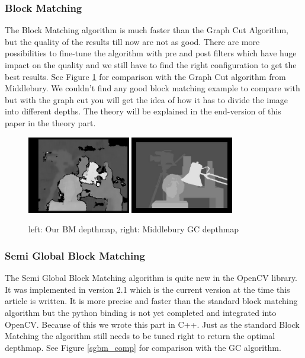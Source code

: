 \documentclass[a4paper]{article}
\begin{document}
\subsubsection{Block Matching}
The Block Matching algorithm is much faster than the Graph Cut
Algorithm, but the quality of the results till now are not as good.
There are more possibilities to fine-tune the algorithm with pre and
post filters which have huge impact on the quality and we still have
to find the right configuration to get the best results. See Figure
\ref{bm_comp} for comparison with the Graph Cut algorithm from
Middlebury. We couldn't find any good block matching example to
compare with but with the graph cut you will get the idea of how it
has to divide the image into different depths. The theory will be
explained in the end-version of this paper in the theory
part. %

\begin{figure} [h!tb]
  \centering
  \includegraphics[width=0.4\textwidth]{bm_tsukuba_own}
  \includegraphics[width=0.4\textwidth]{disp_tsukuba_orig}
  \caption{left: Our BM depthmap, right: Middlebury GC depthmap}
  \label{bm_comp}
\end{figure}

\subsubsection{Semi Global Block Matching}
The Semi Global Block Matching algorithm is quite new in the OpenCV
library. It was implemented in version 2.1 which is the current
version at the time this article is written. It is more precise and
faster than the standard block matching algorithm but the python
binding is not yet completed and integrated into OpenCV. Because of
this we wrote this part in C++. Just as the standard Block Matching
the algorithm still needs to be tuned right to return the optimal
depthmap. See Figure \ref{sgbm_comp} for comparison with the GC
algorithm.
\end{document}
